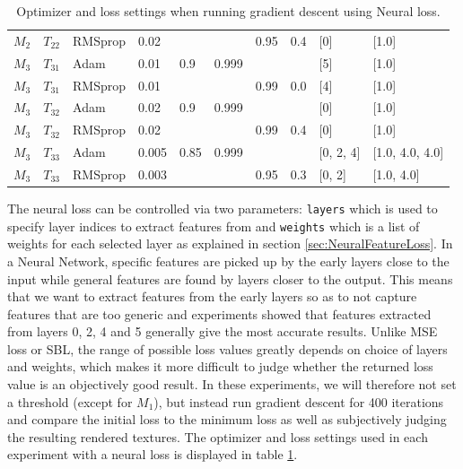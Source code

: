 \begin{table}[!h]
\begin{tabular}{ccllllllll}
 $M_2$     & $T_{22}$   & RMSprop    & 0.02       &            &            & 0.95       & 0.4        & [0]        & [1.0]      \\
  $M_3$     & $T_{31}$   & Adam       & 0.01       & 0.9        & 0.999      &            &            & [5]        & [1.0]      \\
 $M_3$     & $T_{31}$   & RMSprop    & 0.01       &            &            & 0.99       & 0.0        & [4]        & [1.0]      \\
 $M_3$     & $T_{32}$   & Adam       & 0.02       & 0.9        & 0.999      &            &            & [0]        & [1.0]      \\
 $M_3$     & $T_{32}$   & RMSprop    & 0.02       &            &            & 0.99       & 0.4        & [0]        & [1.0]      \\
 $M_3$     & $T_{33}$   & Adam       & 0.005      & 0.85       & 0.999      &            &            & [0, 2, 4]  & [1.0, 4.0, 4.0] \\
 $M_3$     & $T_{33}$   & RMSprop    & 0.003      &            &            & 0.95       & 0.3        & [0, 2]     & [1.0, 4.0] \\
\end{tabular}
\caption{Optimizer and loss settings when running gradient descent using Neural loss.}
\label{tab:NeuralLossOptimizerSettings}
\end{table}


The neural loss can be controlled via two parameters: \texttt{layers} which is used to specify layer indices to extract features from and \texttt{weights} which is a list of weights for each selected layer as explained in section \ref{sec:NeuralFeatureLoss}. In a Neural Network, specific features are picked up by the early layers close to the input while general features are found by layers closer to the output. This means that we want to extract features from the early layers so as to not capture features that are too generic and experiments showed that features extracted from layers 0, 2, 4 and 5 generally give the most accurate results. Unlike MSE loss or SBL, the range of possible loss values greatly depends on choice of layers and weights, which makes it more difficult to judge whether the returned loss value is an objectively good result. In these experiments, we will therefore not set a threshold (except for $M_1$), but instead run gradient descent for 400 iterations and compare the initial loss to the minimum loss as well as subjectively judging the resulting rendered textures. The optimizer and loss settings used in each experiment with a neural loss is displayed in table \ref{tab:NeuralLossOptimizerSettings}.

